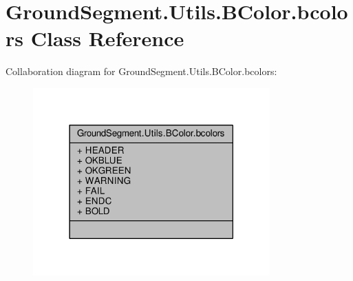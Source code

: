 \hypertarget{class_ground_segment_1_1_utils_1_1_b_color_1_1bcolors}{}\section{Ground\+Segment.\+Utils.\+B\+Color.\+bcolors Class Reference}
\label{class_ground_segment_1_1_utils_1_1_b_color_1_1bcolors}


Collaboration diagram for Ground\+Segment.\+Utils.\+B\+Color.\+bcolors\+:\nopagebreak
\begin{figure}[H]
\begin{center}
\leavevmode
\includegraphics[width=258pt]{class_ground_segment_1_1_utils_1_1_b_color_1_1bcolors__coll__graph}
\end{center}
\end{figure}
